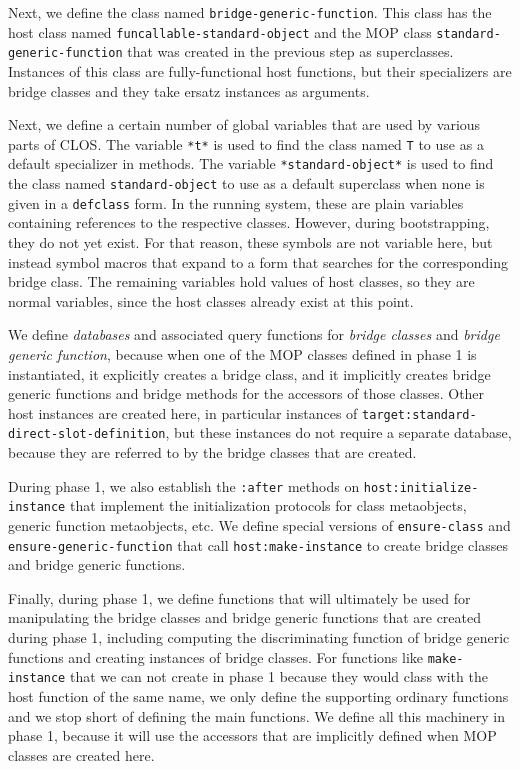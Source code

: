 Next, we define the class named \texttt{bridge-generic-function}.
This class has the host class named
\texttt{funcallable-standard-object} and the MOP class
\texttt{standard-generic-function} that was created in the previous
step as superclasses.  Instances of this class are fully-functional
host functions, but their specializers are bridge classes and they
take ersatz instances as arguments. 

Next, we define a certain number of global variables that are used by
various parts of CLOS.  The variable \texttt{*t*} is used to find the
class named \texttt{T} to use as a default specializer in methods.
The variable \texttt{*standard-object*} is used to find the class
named \texttt{standard-object} to use as a default superclass when
none is given in a \texttt{defclass} form.  In the running system,
these are plain variables containing references to the respective
classes.  However, during bootstrapping, they do not yet exist.  For
that reason, these symbols are not variable here, but instead symbol
macros that expand to a form that searches for the corresponding
bridge class.  The remaining variables hold values of host classes, so
they are normal variables, since the host classes already exist at
this point.

We define \emph{databases} and associated query functions for
\emph{bridge classes} and \emph{bridge generic function}, because when
one of the MOP classes defined in phase 1 is instantiated, it
explicitly creates a bridge class, and it implicitly creates bridge
generic functions and bridge methods for the accessors of those
classes.  Other host instances are created here, in particular
instances of \texttt{target:standard-direct-slot-definition}, but
these instances do not require a separate database, because they are
referred to by the bridge classes that are created. 

During phase 1, we also establish the \texttt{:after} methods on
\texttt{host:initialize-instance} that implement the initialization
protocols for class metaobjects, generic function metaobjects, etc.
We define special versions of \texttt{ensure-class} and
\texttt{ensure-generic-function} that call \texttt{host:make-instance}
to create bridge classes and bridge generic functions.

Finally, during phase 1, we define functions that will ultimately be
used for manipulating the bridge classes and bridge generic functions
that are created during phase 1, including computing the
discriminating function of bridge generic functions and creating
instances of bridge classes.  For functions like
\texttt{make-instance} that we can not create in phase 1 because they
would class with the host function of the same name, we only define
the supporting ordinary functions and we stop short of defining the
main functions.  We define all this machinery in phase 1, because it
will use the accessors that are implicitly defined when MOP classes
are created here. 

